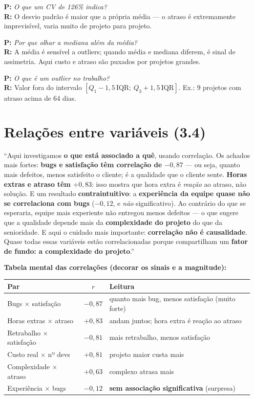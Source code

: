 \documentclass[a4paper, 11pt]{article}
\newcommand{\pergunta}[2]{\par\smallskip\noindent\textbf{P:} \emph{#1}\\
  \textbf{R:} #2}
\begin{document}
\pergunta{O que um CV de 126\% indica?}{O desvio padrão é maior que a própria média --- o atraso é extremamente imprevisível, varia muito de projeto para projeto.}
\pergunta{Por que olhar a mediana além da média?}{A média é sensível a outliers; quando média e mediana diferem, é sinal de assimetria. Aqui custo e atraso são puxados por projetos grandes.}
\pergunta{O que é um outlier no trabalho?}{Valor fora do intervalo $[Q_1-1{,}5\,\text{IQR};\ Q_3+1{,}5\,\text{IQR}]$. Ex.: 9 projetos com atraso acima de 64 dias.}

\section{Relações entre variáveis (3.4)}

\begin{roteiro}
``Aqui investigamos \textbf{o que está associado a quê}, usando correlação. Os achados mais
fortes: \textbf{bugs e satisfação têm correlação de $-0{,}87$} --- ou seja, quanto mais defeitos,
menos satisfeito o cliente; é a qualidade que o cliente sente. \textbf{Horas extras e atraso têm
$+0{,}83$}: isso mostra que hora extra é \emph{reação} ao atraso, não solução. E um resultado
\textbf{contraintuitivo}: a \textbf{experiência da equipe quase não se correlaciona com bugs}
($-0{,}12$, e \emph{não} significativo). Ao contrário do que se esperaria, equipe mais
experiente não entregou menos defeitos --- o que sugere que a qualidade depende mais da
\textbf{complexidade do projeto} do que da senioridade. E aqui o cuidado mais importante:
\textbf{correlação não é causalidade}. Quase todas essas variáveis estão correlacionadas porque
compartilham um \textbf{fator de fundo: a complexidade do projeto}.''
\end{roteiro}

\textbf{Tabela mental das correlações (decorar os sinais e a magnitude):}
\begin{table}[H]
\centering
\begin{tabularx}{\textwidth}{@{} L c L @{}}
\toprule
\textbf{Par} & \textbf{$r$} & \textbf{Leitura} \\
\midrule
Bugs $\times$ satisfação        & $-0{,}87$ & quanto mais bug, menos satisfação (muito forte) \\
Horas extras $\times$ atraso    & $+0{,}83$ & andam juntos; hora extra é reação ao atraso \\
Retrabalho $\times$ satisfação  & $-0{,}81$ & mais retrabalho, menos satisfação \\
Custo real $\times$ nº devs     & $+0{,}81$ & projeto maior custa mais \\
Complexidade $\times$ atraso    & $+0{,}63$ & complexo atrasa mais \\
Experiência $\times$ bugs       & $-0{,}12$ & \textbf{sem associação significativa} (surpresa) \\
\bottomrule
\end{tabularx}
\end{table}
\end{document}
